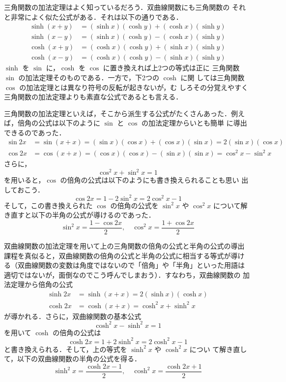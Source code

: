 \documentclass[dvipdfmx,12pt, uplatex]{jsarticle}
\begin{document}
三角関数の加法定理はよく知っているだろう．双曲線関数にも三角関数の
それと非常によく似た公式がある．それは以下の通りである．
\begin{align*}
  \sinh (x+y) &= (\sinh x) (\cosh y) + (\cosh x) (\sinh y)\\
  \sinh (x-y) &= (\sinh x) (\cosh y) - (\cosh x) (\sinh y)\\
  \cosh (x+y) &= (\cosh x) (\cosh y) + (\sinh x) (\sinh y)\\
  \cosh (x-y) &= (\cosh x) (\cosh y) - (\sinh x) (\sinh y)
\end{align*}
$\sinh$ を $\sin$ に，$\cosh$ を $\cos$ に置き換えれば上2つの等式は正に
三角関数 $\sin$ の加法定理そのものである．一方で，下2つの $\cosh$ に関
しては三角関数 $\cos$ の加法定理とは異なり符号の反転が起きないが，む
しろその分覚えやすく三角関数の加法定理よりも素直な公式であるとも言える．

三角関数の加法定理といえば，そこから派生する公式がたくさんあった．例え
ば，倍角の公式は以下のように $\sin$ と $\cos$ の加法定理からいとも簡単
に導出できるのであった．
\begin{align*}
  \sin 2x &= \sin(x+x)=(\sin x)(\cos x) + (\cos x)(\sin x) 
            = 2 (\sin x) (\cos x)\\
  \cos 2x &= \cos(x+x) = (\cos x)(\cos x) - (\sin x)(\sin x)
            =\cos^2 x - \sin^2 x
\end{align*}
さらに，
\[
  \cos^2 x + \sin^2 x = 1
\]
を用いると，$\cos$ の倍角の公式は以下のようにも書き換えられることも思い
出しておこう．
\[
\cos 2x = 1 - 2\sin^2 x = 2 \cos^2 x -1
\]
そして，この書き換えられた $\cos$ の倍角の公式を $\sin^2 x$ や $\cos^2
x$ について解き直すと以下の半角の公式が導けるのであった．
\[
  \sin^2 x = \frac{1-\cos 2x}{2}, \quad \cos^2 x = \frac{1+\cos 2x}{2}
\]

双曲線関数の加法定理を用いて上の三角関数の倍角の公式と半角の公式の導出
課程を真似ると，双曲線関数の倍角の公式と半角の公式に相当する等式が導け
る（双曲線関数の変数は角度ではないので「倍角」や「半角」といった用語は
適切ではないが，面倒なのでこう呼んでしまおう）．すなわち，双曲線関数の
加法定理から倍角の公式
\begin{align*}
  \sinh 2x &= \sinh(x+x) = 2 (\sinh x)(\cosh x)\\
  \cosh 2x &= \cosh(x+x) = \cosh^2 x + \sinh^2 x
\end{align*}
が導かれる．さらに，双曲線関数の基本公式
\[
\cosh^2 x - \sinh^2 x=1
\]
を用いて $\cosh$ の倍角の公式は
\[
\cosh 2x = 1 + 2 \sinh^2 x = 2 \cosh^2 x -1
\]
と書き換えられる．そして，上の等式を $\sinh^2 x$ や $\cosh^2 x$ につい
て解き直して，以下の双曲線関数の半角の公式を得る．
\[
  \sinh^2 x = \frac{\cosh 2x -1}{2}, \quad \cosh^2 x = \frac{\cosh 2x +1}{2}
\]
\end{document}
